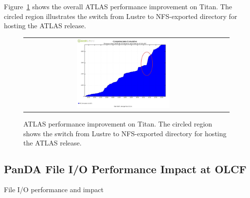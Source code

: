 Figure~\ref{fig:atlas-perf-improvement} shows the overall ATLAS performance
improvement on Titan. The circled region illustrates the switch from Lustre to
NFS-exported directory for hosting the ATLAS release.

\begin{figure}[!htb]
    \centering
    \begin{tabular}{cc}
        {\includegraphics[width=0.48\textwidth]{figures/panda-completed-jobs-sw-move.pdf}}\\
    \end{tabular}
    \caption{ATLAS performance improvement on Titan. The circled region shows the switch from Lustre to NFS-exported directory for hosting the ATLAS release.}
    \label{fig:atlas-perf-improvement}
\end{figure}



\subsection{PanDA File I/O Performance Impact at OLCF}

File I/O performance and impact




